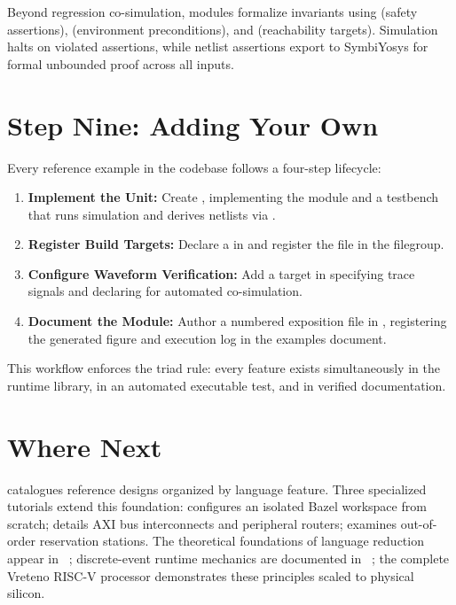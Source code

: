 \documentclass[journal,9pt]{IEEEtran}
\begin{document}
Beyond regression co-simulation, modules formalize invariants using 
(safety assertions),  (environment preconditions), and
 (reachability targets). Simulation halts on violated assertions,
while netlist assertions export to SymbiYosys for formal unbounded proof across
all inputs.

\section{Step Nine: Adding Your Own}
\label{sec:t-adding}

Every reference example in the codebase follows a four-step lifecycle:

\begin{enumerate}
\item \textbf{Implement the Unit:} Create ,
  implementing the module and a testbench that runs simulation and derives
  netlists via .
\item \textbf{Register Build Targets:} Declare a  in
   and register the file in the 
  filegroup.
\item \textbf{Configure Waveform Verification:} Add a  target
  in  specifying trace signals and declaring
   for automated co-simulation.
\item \textbf{Document the Module:} Author a numbered exposition file in
  , registering the generated figure and
  execution log in the examples document.
\end{enumerate}

This workflow enforces the triad rule: every feature exists simultaneously in
the runtime library, in an automated executable test, and in verified
documentation.

\section{Where Next}
\label{sec:t-next}

 catalogues reference designs organized by language
feature. Three specialized tutorials extend this foundation: 
configures an isolated Bazel workspace from scratch;  details
AXI bus interconnects and peripheral routers;  examines
out-of-order reservation stations. The theoretical foundations of language
reduction appear in ~\cite{embedding}; discrete-event
runtime mechanics are documented in ~\cite{runtime}; the
complete Vreteno RISC-V processor demonstrates these principles scaled to
physical silicon.
\end{document}
